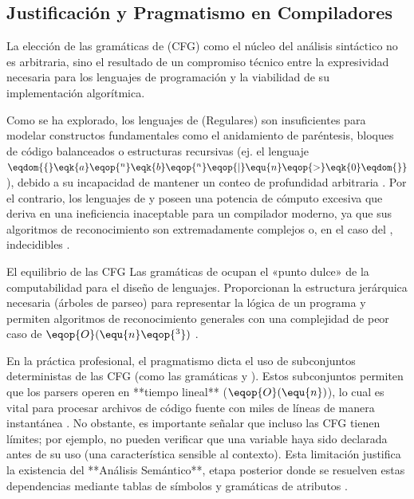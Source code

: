 \subsection{Justificación y Pragmatismo en Compiladores}
\label{subsec:3_2_4_justificacion}

La elección de las gramáticas de  (CFG) como el núcleo del análisis sintáctico no es arbitraria, sino el resultado de un compromiso técnico entre la expresividad necesaria para los lenguajes de programación y la viabilidad de su implementación algorítmica.

Como se ha explorado, los lenguajes de  (Regulares) son insuficientes para modelar constructos fundamentales como el anidamiento de paréntesis, bloques de código balanceados o estructuras recursivas (ej. el lenguaje $\eqdom{\{}\eqk{a}\eqop{^n}\eqk{b}\eqop{^n}\eqop{\mid}\equ{n}\eqop{>}\eqk{0}\eqdom{\}}$), debido a su incapacidad de mantener un conteo de profundidad arbitraria \cite{sipser2012introduction, aho2006compilers}. Por el contrario, los lenguajes de  y  poseen una potencia de cómputo excesiva que deriva en una ineficiencia inaceptable para un compilador moderno, ya que sus algoritmos de reconocimiento son extremadamente complejos o, en el caso del , indecidibles \cite{aho2006compilers, sipser2012introduction}.

\begin{observacion}{El equilibrio de las CFG}
Las gramáticas de  ocupan el «punto dulce» de la computabilidad para el diseño de lenguajes. Proporcionan la estructura jerárquica necesaria (árboles de parseo) para representar la lógica de un programa y permiten algoritmos de reconocimiento generales con una complejidad de peor caso de $\eqop{O}(\equ{n}\eqop{^3})$ \cite{aho2006compilers}.
\end{observacion}

En la práctica profesional, el pragmatismo dicta el uso de subconjuntos deterministas de las CFG (como las gramáticas  y ). Estos subconjuntos permiten que los parsers operen en **tiempo lineal** ($\eqop{O}(\equ{n})$), lo cual es vital para procesar archivos de código fuente con miles de líneas de manera instantánea \cite{aho2006compilers}. No obstante, es importante señalar que incluso las CFG tienen límites; por ejemplo, no pueden verificar que una variable haya sido declarada antes de su uso (una característica sensible al contexto). Esta limitación justifica la existencia del **Análisis Semántico**, etapa posterior donde se resuelven estas dependencias mediante tablas de símbolos y gramáticas de atributos \cite{aho2006compilers}.

